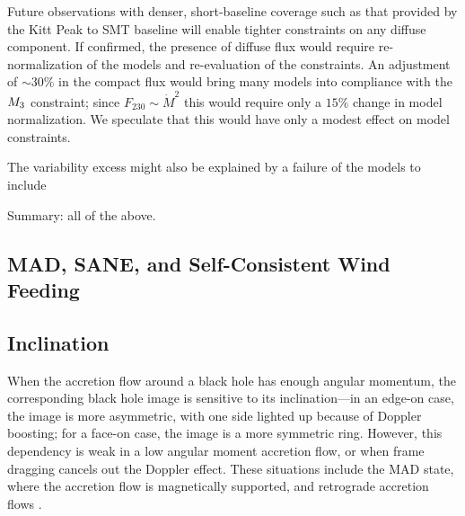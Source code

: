Future observations with denser, short-baseline coverage such as that provided by the Kitt Peak to SMT baseline will enable tighter constraints on any diffuse component.  If confirmed, the presence of diffuse flux would require re-normalization of the models and re-evaluation of the constraints.  An adjustment of $\sim 30\%$ in the compact flux would bring many models into compliance with the $M_{3}$ constraint; since $F_{230} \sim \dot{M}^2$ this would require only a $15\%$ change in model normalization.  We speculate that this would have only a modest effect on model constraints.

The variability excess might also be explained by a failure of the models to include 

Summary: all of the above.

\subsection{MAD, SANE, and Self-Consistent Wind Feeding}


\subsection{Inclination}


When the accretion flow around a black hole has enough angular momentum, the corresponding black hole image is sensitive to its inclination---in an edge-on case, the image is more asymmetric, with one side lighted up because of Doppler boosting; for a face-on case, the image is a more symmetric ring.
However, this dependency is weak in a low angular moment accretion flow, or when frame dragging cancels out the Doppler effect. These situations include the MAD state, where the accretion flow is magnetically supported, and retrograde accretion flows \citep{2021arXiv210503424M}.

